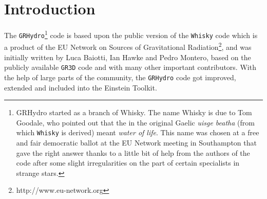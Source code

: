 \documentclass{article}
\begin{document}





\begin{abstract}
  {\tt GRHydro} is a fully general-relativistic three-dimensional hydrodynamics code. It evolves the
  hydrodynamics using High Resolution Shock Capturing methods and can
  work with realistic equations of state. The evolution of the
  spacetime can be done by any other ``appropriate'' thorn, such as
  the {\tt CCATIE} code, maintained and developed at the Albert-Einstein-Institut (Potsdam).
\end{abstract}


\section{Introduction}
\label{sec:intro}

The {\tt GRHydro}\footnote{GRHydro started as a branch of Whisky. 
  The name Whisky is
  due to Tom Goodale, who pointed out that the in the original Gaelic
  {\it uisge beatha} (from which {\tt Whisky} is derived) meant {\it water of
  life}. This name was chosen at a free and fair democratic ballot
  at the EU Network meeting in Southampton that gave the right answer
  thanks to a little bit of help from the authors of the code after
  some slight irregularities on the part of certain specialists in
  strange stars.} code is based upon the public version of the {\tt Whisky} code which
  is a product of the EU Network on Sources of
  Gravitational Radiation\footnote{http://www.eu-network.org},
  and was initially written by Luca Baiotti, Ian Hawke
  and Pedro Montero, based on the publicly available {\tt GR3D} code and
  with many other important contributors.
  With the help of large parts of the community, the {\tt GRHydro} code got
  improved, extended and included into the Einstein Toolkit.
\end{document}

